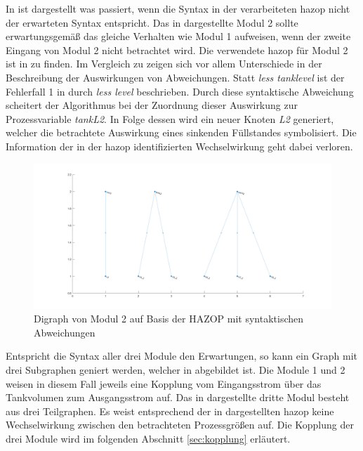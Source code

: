 In  ist dargestellt was passiert, wenn die Syntax in der verarbeiteten \ac{hazop} nicht der erwarteten Syntax entspricht. Das in  dargestellte Modul 2 sollte erwartungsgem\"a\ss{} das gleiche Verhalten wie Modul 1 aufweisen, wenn der zweite Eingang von Modul 2 nicht betrachtet wird. Die verwendete \ac{hazop} f\"ur Modul 2 ist in  zu finden. Im Vergleich zu  zeigen sich vor allem Unterschiede in der Beschreibung der Auswirkungen von Abweichungen. Statt \textit{less tanklevel} ist der Fehlerfall 1 in  durch \textit{less level} beschrieben. Durch diese syntaktische Abweichung scheitert der Algorithmus bei der Zuordnung dieser Auswirkung zur Prozessvariable \textit{tankL2}. In Folge dessen wird ein neuer Knoten \textit{L2} generiert, welcher die betrachtete Auswirkung eines sinkenden F\"ullstandes symbolisiert. Die Information der in der \ac{hazop} identifizierten Wechselwirkung geht dabei verloren. 
\begin{figure}[h!tb]
\centering
\includegraphics[width=\textwidth]{bilder/04_code_Modul2_Error.png}
\caption[fehlerhafter Digraph von Modul 2]{Digraph von Modul 2 auf Basis der HAZOP mit syntaktischen Abweichungen}
\label{fig:graph_mod2Error}
\end{figure}

Entspricht die Syntax aller drei Module den Erwartungen, so kann ein Graph mit drei Subgraphen geniert werden, welcher in  abgebildet ist. Die Module 1 und 2 weisen in diesem Fall jeweils eine Kopplung vom Eingangsstrom \"uber das Tankvolumen zum Ausgangsstrom auf. Das in  dargestellte dritte Modul besteht aus drei Teilgraphen. Es weist entsprechend der in  dargestellten \ac{hazop} keine Wechselwirkung zwischen den betrachteten Prozessgr\"o\ss{}en auf. Die Kopplung der drei Module wird im folgenden Abschnitt \ref{sec:kopplung} erl\"autert.

